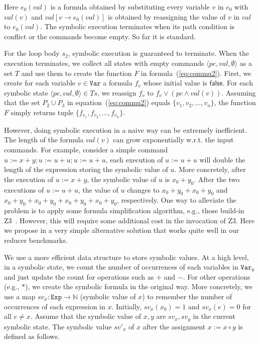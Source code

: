 \documentclass{llncs}
\newcommand{\Var}{\mathtt{Var}}
\newcommand{\Exp}{\mathtt{Exp}}
\newcommand{\false}{\mathsf{false}}
\begin{document}
Here $e_0(val)$ is a formula obtained by substituting every variable $v$ in $e_0$ with $val(v)$ and $val[v \rightarrow e_0(val) ]$ is obtained by reassigning the value of $v$ in $val$ to $e_0(val)$. The symbolic execution terminates when its path condition is conflict or the commands become empty. So far it is standard. 

For the loop body $s_2$, symbolic execution is guaranteed to terminate.
When the execution terminates, we collect all states with empty commands $\langle pc, val, \emptyset \rangle$ as a set $T$ and use them to create the function $F$ in formula~(\ref{eq:commu2}). 
First, we create for each variable $v\in\Var$ a formula $f_v$ whose initial value is $\false$. For each symbolic state $\langle pc, val, \emptyset \rangle \in Ts$, we reassign $f_v$ to $f_v \vee (pc \wedge val(v))$. 
Assuming that the set $P_2\cup P_3$ in equation~(\ref{eq:commu2}) equals $\{v_1,v_2,\ldots,v_n\}$, the function $F$ simply returns tuple $\{f_{v_1},f_{v_2},\ldots, f_{v_n}\}$.
 
However, doing symbolic execution in a naive way can be extremely inefficient. 
The length of the formula $val(v)$ can grow exponentially w.r.t. the input commands. For example, consider a simple command $u:=x+y;u:=u+u;u:=u+u$, each execution of $u:= u+ u$ will double the length of the expression storing the symbolic value of $u$. More concretely, after the execution of $u:=x+y$, the symbolic value of $u$ is $x_0+y_0$. After the two executions of $u:=u+u$, the value of $u$ changes to $x_0+y_0+x_0+y_0$ and $x_0+y_0+x_0+y_0+x_0+y_0+x_0+y_0$, respectively. One way to alleviate the problem is to apply some formula simplification algorithm, e.g., those build-in Z3~\cite{z3}. 
However, this will require some additional cost in the invocation of Z3. Here we propose in a very simple alternative solution that works quite well in our reducer benchmarks.

We use a more efficient data structure to store symbolic values. At a high level, in a symbolic state, we count the number of occurrences of each variables in $\Var_0$ and just update the count for operations such as $+$ and $-$. For other operations (e.g., $*$), we create the symbolic formula in the original way.
More concretely, we use a map $sv_x:\Exp\rightarrow \mathbb{N}$ (symbolic value of $x$) to remember the number of occurrences of each expression in $x$. Initially, $sv_x(x_0) = 1$ and $sv_x (e) =0$ for all $e\neq x$. Assume that the symbolic value of $x,y$ are $sv_x,sv_y$ in the current symbolic state. The symbolic value $sv'_x$ of $x$ after the assignment $x:=x\circ y$ is defined as follows. 
\end{document}
